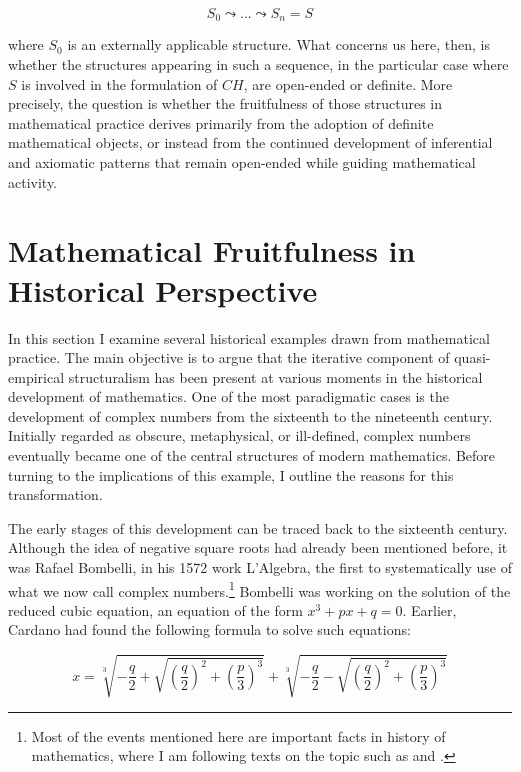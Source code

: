\documentclass[11pt,a4paper]{article}
\begin{document}
$$ S_0 \leadsto ... \leadsto S_n = S $$

where $S_0$ is an externally applicable structure. What concerns us here, then, is whether the structures appearing in such a sequence, in the particular case where $S$ is involved in the formulation of $CH$, are open-ended or definite. More precisely, the question is whether the fruitfulness of those structures in mathematical practice derives primarily from the adoption of definite mathematical objects, or instead from the continued development of inferential and axiomatic patterns that remain open-ended while guiding mathematical activity.


\section{Mathematical Fruitfulness in Historical Perspective}
\label{history-section}

In this section I examine several historical examples drawn from mathematical practice. The main objective is to argue that the iterative component of quasi-empirical structuralism has been present at various moments in the historical development of mathematics. One of the most paradigmatic cases is the development of complex numbers from the sixteenth to the nineteenth century. Initially regarded as obscure, metaphysical, or ill-defined, complex numbers eventually became one of the central structures of modern mathematics. Before turning to the implications of this example, I outline the reasons for this transformation.

The early stages of this development can be traced back to the sixteenth century. Although the idea of negative square roots had already been mentioned before, it was Rafael Bombelli, in his 1572 work L’Algebra, the first to systematically use of what we now call complex numbers.\footnote{Most of the events mentioned here are important facts in history of mathematics, where I am following texts on the topic such as \textcite{Nahin2010} and \textcite{Christen2018}.} Bombelli was working on the solution of the reduced cubic equation, an equation of the form $x^3 + px + q = 0$. Earlier, Cardano had found the following formula to solve such equations:

\begin{equation}
x = \sqrt[3]{-\frac{q}{2} + \sqrt{\left(\frac{q}{2}\right)^2 + \left(\frac{p}{3}\right)^3}} 
+ \sqrt[3]{-\frac{q}{2} - \sqrt{\left(\frac{q}{2}\right)^2 + \left(\frac{p}{3}\right)^3}}
\end{equation} 
\end{document}
